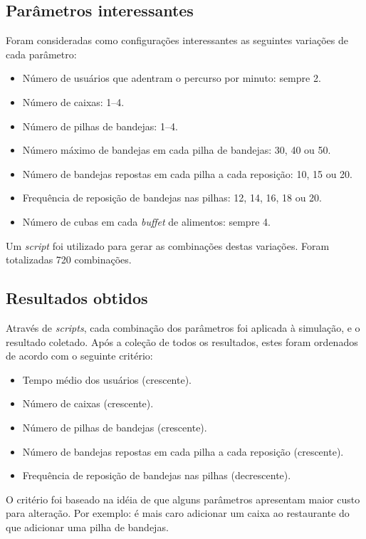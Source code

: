 \documentclass{article}
\begin{document}
\subsection{Parâmetros interessantes}
Foram consideradas como configurações interessantes as seguintes variações de cada parâmetro:
\begin{itemize}
  \setlength\itemsep{0px}
  \item Número de usuários que adentram o percurso por minuto: sempre 2.
  \item Número de caixas: 1--4.
  \item Número de pilhas de bandejas: 1--4.
  \item Número máximo de bandejas em cada pilha de bandejas: 30, 40 ou 50.
  \item Número de bandejas repostas em cada pilha a cada reposição: 10, 15 ou 20.
  \item Frequência de reposição de bandejas nas pilhas: 12, 14, 16, 18 ou 20.
  \item Número de cubas em cada \textit{buffet} de alimentos: sempre 4.
\end{itemize}
Um \textit{script} foi utilizado para gerar as combinações destas variações. Foram totalizadas 720 combinações.

\pagebreak

\subsection{Resultados obtidos}
Através de \textit{scripts}, cada combinação dos parâmetros foi aplicada à simulação, e o resultado coletado. Após a coleção de todos os resultados, estes foram ordenados de acordo com o seguinte critério:
\begin{itemize}
  \setlength\itemsep{0px}
  \item Tempo médio dos usuários (crescente).
  \item Número de caixas (crescente).
  \item Número de pilhas de bandejas (crescente).
  \item Número de bandejas repostas em cada pilha a cada reposição (crescente).
  \item Frequência de reposição de bandejas nas pilhas (decrescente).
\end{itemize}
O critério foi baseado na idéia de que alguns parâmetros apresentam maior custo para alteração. Por exemplo: é mais caro adicionar um caixa ao restaurante do que adicionar uma pilha de bandejas.
\end{document}
